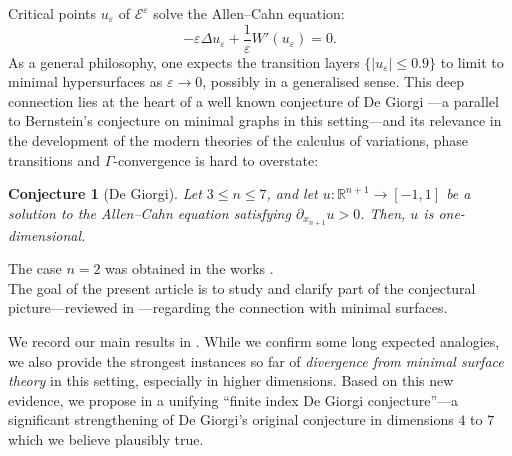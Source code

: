 \documentclass{article}
\newcommand{\eps}{\varepsilon}
\newcommand{\R}{\mathbb{R}}
\newcommand{\ep}{\varepsilon}
\newtheorem{lconjecture}{Conjecture} %
\theoremstyle{definition}
\begin{document}
Critical points $u_\eps$ of \( \mathcal{E}^\varepsilon \) solve the Allen--Cahn equation:
\begin{equation}\label{eq:epaceqintro}
    -\ep \Delta u_\ep + \frac{1}{\ep}W'(u_\ep) = 0.
\end{equation}
As a general philosophy, one expects the transition layers $\{|u_\ep|\leq 0.9\}$ to limit to minimal hypersurfaces as $\ep\to 0$, possibly in a generalised sense. This deep connection lies at the heart of a well known conjecture of De Giorgi \cite{DeG78}---a parallel to Bernstein's conjecture on minimal graphs in this setting---and its relevance in the development of the modern theories of the calculus of variations, phase transitions and $\Gamma$-convergence is hard to overstate:
\begin{lconjecture}[De Giorgi]\label{conj:originalDG}
    Let $3\leq n\leq 7$, and let $u:\R^{n+1}\to[-1,1]$ be a solution to the Allen--Cahn equation satisfying $\partial_{x_{n+1}} u>0$. Then, $u$ is one-dimensional.
\end{lconjecture}
The case $n=2$ was obtained in the works \cite{GG98,AC00}.\\

The goal of the present article is to study and clarify part of the conjectural picture---reviewed in ---regarding the connection with minimal surfaces.

We record our main results in . While we confirm some long expected analogies, we also provide the strongest instances so far of \textit{divergence from minimal surface theory} in this setting, especially in higher dimensions. Based on this new evidence, we propose in  a unifying ``finite index De Giorgi conjecture''---a significant strengthening of De Giorgi's original conjecture in dimensions $4$ to $7$ which we believe plausibly true.\\
\end{document}

